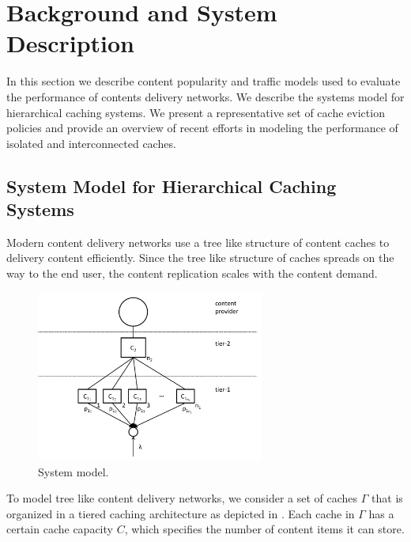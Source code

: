 \section{Background and System Description}\label{sec:hierarchical:related_work}

In this section we describe content popularity and traffic models used to evaluate the performance of contents delivery networks.
We describe the systems model for hierarchical caching systems.
We present a representative set of cache eviction policies and provide an overview of recent efforts in modeling the performance of isolated and interconnected caches.

\subsection{System Model for Hierarchical Caching Systems}\label{sec:hierarchical:system_model}

Modern content delivery networks use a tree like structure of content caches to delivery content efficiently.
Since the tree like structure of caches spreads on the way to the end user, the content replication scales with the content demand.

\begin{figure}[tb]
\centering
\includegraphics[width=75mm]{hierarchical/analyticbw/figures/hcmodeln1}
\caption{System model.}
\label{fig:hcmodel}
\end{figure}

To model tree like content delivery networks, we consider a set of caches $\Gamma$ that is organized in a tiered caching architecture as depicted in . Each cache in $\Gamma$ has a certain cache capacity $C$, which specifies the number of content items it can store.


